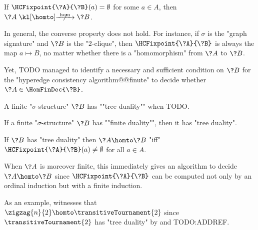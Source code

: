 \begin{corollary}
	\AP\label{coro:HC-empty-implies-no-hom}
	If $\HCFixpoint{\?A}{\?B}(a) = \emptyset$ for some $a\in A$, then
	$\?A \nothomto \?B$.
\end{corollary}

In general, the converse property does not hold. For instance, if $\sigma$ is the
"graph signature" and $\?B$ is the "$2$-clique", then $\HCFixpoint{\?A}{\?B}$
is always the map $a \mapsto B$, no matter whether there is a "homomorphism" from
$\?A$ to $\?B$.

Yet, TODO managed to identify a necessary and sufficient condition on $\?B$ for
the "hyperedge consistency algorithm@@finute" to decide whether $\?A \in \HomFinDec{\?B}$.
\begin{definition}
	\AP\label{defn:tree-duality}
	A finite "$\sigma$-structure" $\?B$ has ""tree duality"" when TODO.
\end{definition}

\begin{proposition}
	\AP\label{prop:finite-duality-implies-tree-duality}
	If a finite "$\sigma$-structure" $\?B$ has ""finite duality"",
	then it has "tree duality".
\end{proposition}

\begin{proposition}
	\AP\label{prop:hyperedge-consistency-tree-duality}
	If $\?B$ has "tree duality" then $\?A \homto \?B$ "iff"
	$\HCFixpoint{\?A}{\?B}(a) \neq \emptyset$ for all $a\in A$.
\end{proposition}

When $\?A$ is moreover finite, this immediately gives an algorithm to decide
$\?A \homto \?B$ since $\HCFixpoint{\?A}{\?B}$ can be computed not only
by an ordinal induction but with a finite induction.

As an example,  witnesses that
$\zigzag{n}{2} \homto \transitiveTournament{2}$ since $\transitiveTournament{2}$
has "tree duality" by  and TODO:ADDREF.

